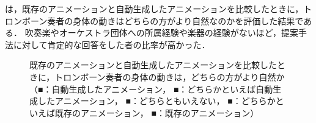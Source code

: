 \vspace{5mm}
\par
{}は，既存のアニメーションと自動生成したアニメーションを比較したときに，トロンボーン奏者の身体の動きはどちらの方がより自然なのかを評価した結果である．
吹奏楽やオーケストラ団体への所属経験や楽器の経験がないほど，提案手法に対して肯定的な回答をした者の比率が高かった．
\begin{figure}[!h]
	\centering
	\hspace{5mm}
	\hspace{5mm}
	\caption{既存のアニメーションと自動生成したアニメーションを比較したときに，トロンボーン奏者の身体の動きは，どちらの方がより自然か\\
		（{\color{legend1}■}：自動生成したアニメーション，
		{\color{legend2}■}：どちらかといえば自動生成したアニメーション，
		{\color{legend3}■}：どちらともいえない，
		{\color{legend4}■}：どちらかといえば既存のアニメーション，
		{\color{legend5}■}：既存のアニメーション）}
	\label{fig:Q2-4}
\end{figure}
\newpage

